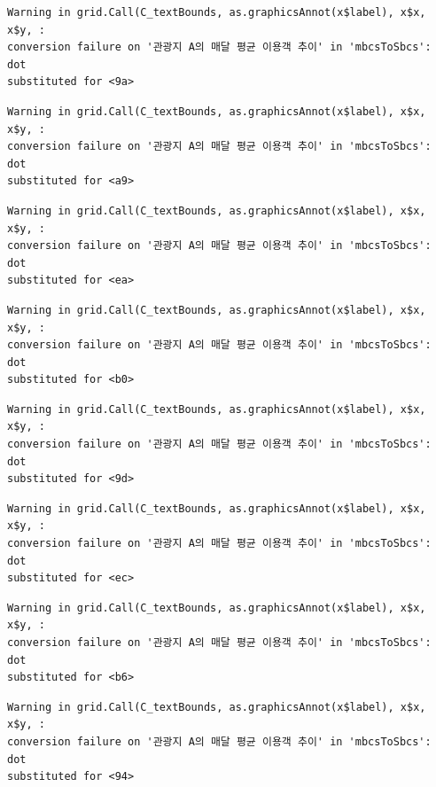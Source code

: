 \documentclass[
  letterpaper,
  DIV=11,
  numbers=noendperiod]{scrreprt}
\begin{document}
\begin{verbatim}
Warning in grid.Call(C_textBounds, as.graphicsAnnot(x$label), x$x, x$y, :
conversion failure on '관광지 A의 매달 평균 이용객 추이' in 'mbcsToSbcs': dot
substituted for <9a>
\end{verbatim}

\begin{verbatim}
Warning in grid.Call(C_textBounds, as.graphicsAnnot(x$label), x$x, x$y, :
conversion failure on '관광지 A의 매달 평균 이용객 추이' in 'mbcsToSbcs': dot
substituted for <a9>
\end{verbatim}

\begin{verbatim}
Warning in grid.Call(C_textBounds, as.graphicsAnnot(x$label), x$x, x$y, :
conversion failure on '관광지 A의 매달 평균 이용객 추이' in 'mbcsToSbcs': dot
substituted for <ea>
\end{verbatim}

\begin{verbatim}
Warning in grid.Call(C_textBounds, as.graphicsAnnot(x$label), x$x, x$y, :
conversion failure on '관광지 A의 매달 평균 이용객 추이' in 'mbcsToSbcs': dot
substituted for <b0>
\end{verbatim}

\begin{verbatim}
Warning in grid.Call(C_textBounds, as.graphicsAnnot(x$label), x$x, x$y, :
conversion failure on '관광지 A의 매달 평균 이용객 추이' in 'mbcsToSbcs': dot
substituted for <9d>
\end{verbatim}

\begin{verbatim}
Warning in grid.Call(C_textBounds, as.graphicsAnnot(x$label), x$x, x$y, :
conversion failure on '관광지 A의 매달 평균 이용객 추이' in 'mbcsToSbcs': dot
substituted for <ec>
\end{verbatim}

\begin{verbatim}
Warning in grid.Call(C_textBounds, as.graphicsAnnot(x$label), x$x, x$y, :
conversion failure on '관광지 A의 매달 평균 이용객 추이' in 'mbcsToSbcs': dot
substituted for <b6>
\end{verbatim}

\begin{verbatim}
Warning in grid.Call(C_textBounds, as.graphicsAnnot(x$label), x$x, x$y, :
conversion failure on '관광지 A의 매달 평균 이용객 추이' in 'mbcsToSbcs': dot
substituted for <94>
\end{verbatim}
\end{document}
